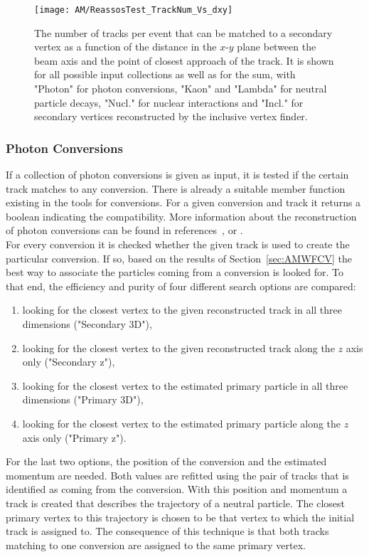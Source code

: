 \begin{figure}[!ht]
    \centering
    \texttt{[image: AM/ReassosTest\_TrackNum\_Vs\_dxy]}
    \caption[Number of tracks that can be matched to a secondary vertex]{The number of tracks per event that can be matched to a secondary vertex as a function of the distance in the $x$-$y$ plane between the beam axis and the point of closest approach of the track. It is shown for all possible input collections as well as for the sum, with "Photon" for photon conversions, "Kaon" and "Lambda" for neutral particle decays, "Nucl." for nuclear interactions and "Incl." for secondary vertices reconstructed by the inclusive vertex finder.\label{plot:AMWFSVfrac}}
\end{figure}

\subsubsection{Photon Conversions \label{sec:AMWFSVpc}}
If a collection of photon conversions is given as input, it is tested if the certain track matches to any conversion. There is already a suitable member function existing in the tools for conversions. For a given conversion and track it returns a boolean indicating the compatibility. More information about the reconstruction of photon conversions can be found in references~,  or . \\
For every conversion it is checked whether the given track is used to create the particular conversion. If so, based on the results of Section~\ref{sec:AMWFCV} the best way to associate the particles coming from a conversion is looked for. To that end, the efficiency and purity of four different search options are compared:
\begin{enumerate}
    \item looking for the closest vertex to the given reconstructed track in all three dimensions ("Secondary 3D"),
    \item looking for the closest vertex to the given reconstructed track along the $z$ axis only ("Secondary z"),
    \item looking for the closest vertex to the estimated primary particle in all three dimensions ("Primary 3D"),
    \item looking for the closest vertex to the estimated primary particle along the $z$ axis only ("Primary z").
\end{enumerate}
For the last two options, the position of the conversion and the estimated momentum are needed. Both values are refitted using the pair of tracks that is identified as coming from the conversion. With this position and momentum a track is created that describes the trajectory of a neutral particle. The closest primary vertex to this trajectory is chosen to be that vertex to which the initial track is assigned to. The consequence of this technique is that both tracks matching to one conversion are assigned to the same primary vertex. \\
